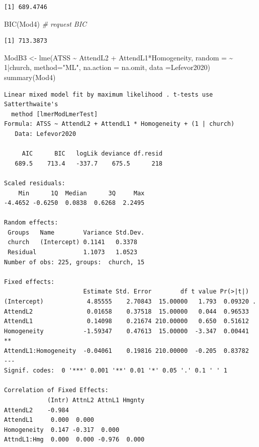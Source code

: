 \documentclass[
  english,
]{book}
\newenvironment{Shaded}{\begin{snugshade}}{\end{snugshade}}
\newcommand{\AttributeTok}[1]{\textcolor[rgb]{0.77,0.63,0.00}{#1}}
\newcommand{\CommentTok}[1]{\textcolor[rgb]{0.56,0.35,0.01}{\textit{#1}}}
\newcommand{\DecValTok}[1]{\textcolor[rgb]{0.00,0.00,0.81}{#1}}
\newcommand{\FunctionTok}[1]{\textcolor[rgb]{0.00,0.00,0.00}{#1}}
\newcommand{\NormalTok}[1]{#1}
\newcommand{\OtherTok}[1]{\textcolor[rgb]{0.56,0.35,0.01}{#1}}
\newcommand{\SpecialCharTok}[1]{\textcolor[rgb]{0.00,0.00,0.00}{#1}}
\newcommand{\StringTok}[1]{\textcolor[rgb]{0.31,0.60,0.02}{#1}}
\begin{document}
\begin{verbatim}
[1] 689.4746
\end{verbatim}

\begin{Shaded}
\begin{Highlighting}[]
\FunctionTok{BIC}\NormalTok{(Mod4) }\CommentTok{\# request BIC}
\end{Highlighting}
\end{Shaded}

\begin{verbatim}
[1] 713.3873
\end{verbatim}

\begin{Shaded}
\begin{Highlighting}[]
\NormalTok{ModB3 }\OtherTok{\textless{}{-}} \FunctionTok{lme}\NormalTok{(ATSS }\SpecialCharTok{\textasciitilde{}}\NormalTok{  AttendL2 }\SpecialCharTok{+}\NormalTok{ AttendL1}\SpecialCharTok{*}\NormalTok{Homogeneity, }\AttributeTok{random =} \SpecialCharTok{\textasciitilde{}} \DecValTok{1}\SpecialCharTok{|}\NormalTok{church, }\AttributeTok{method=}\StringTok{"ML"}\NormalTok{, }\AttributeTok{na.action =}\NormalTok{ na.omit, }\AttributeTok{data =}\NormalTok{Lefevor2020)}
\FunctionTok{summary}\NormalTok{(Mod4)}
\end{Highlighting}
\end{Shaded}

\begin{verbatim}
Linear mixed model fit by maximum likelihood . t-tests use Satterthwaite's
  method [lmerModLmerTest]
Formula: ATSS ~ AttendL2 + AttendL1 * Homogeneity + (1 | church)
   Data: Lefevor2020

     AIC      BIC   logLik deviance df.resid 
   689.5    713.4   -337.7    675.5      218 

Scaled residuals: 
    Min      1Q  Median      3Q     Max 
-4.4652 -0.6250  0.0838  0.6268  2.2495 

Random effects:
 Groups   Name        Variance Std.Dev.
 church   (Intercept) 0.1141   0.3378  
 Residual             1.1073   1.0523  
Number of obs: 225, groups:  church, 15

Fixed effects:
                      Estimate Std. Error        df t value Pr(>|t|)   
(Intercept)            4.85555    2.70843  15.00000   1.793  0.09320 . 
AttendL2               0.01658    0.37518  15.00000   0.044  0.96533   
AttendL1               0.14098    0.21674 210.00000   0.650  0.51612   
Homogeneity           -1.59347    0.47613  15.00000  -3.347  0.00441 **
AttendL1:Homogeneity  -0.04061    0.19816 210.00000  -0.205  0.83782   
---
Signif. codes:  0 '***' 0.001 '**' 0.01 '*' 0.05 '.' 0.1 ' ' 1

Correlation of Fixed Effects:
            (Intr) AttnL2 AttnL1 Hmgnty
AttendL2    -0.984                     
AttendL1     0.000  0.000              
Homogeneity  0.147 -0.317  0.000       
AttndL1:Hmg  0.000  0.000 -0.976  0.000
\end{verbatim}
\end{document}
